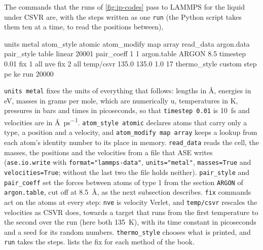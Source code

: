 The commands that the runs of \cref{fig:ip-codes} pass to LAMMPS for the
liquid under CSVR are, with the steps written as one \texttt{run} (the
Python script takes them ten at a time, to read the positions between),
\begin{code}[language={},morecomment={[l]\#}]
units metal
atom_style atomic
atom_modify map array
read_data argon.data
pair_style table linear 20001
pair_coeff 1 1 argon.table ARGON 8.5
timestep 0.01
fix 1 all nve
fix 2 all temp/csvr 135.0 135.0 1.0 17
thermo_style custom step pe ke
run 20000
\end{code}
\noindent \texttt{units metal} fixes the units of everything that
follows: lengths in \si{\angstrom}, energies in \si{\electronvolt}, masses
in grams per mole, which are numerically \si{\amu}, temperatures in
\si{\kelvin}, pressures in bars and times in picoseconds, so that
\texttt{timestep 0.01} is \SI{10}{\femto\second} and velocities are in
\si{\angstrom\per\pico\second}. \texttt{atom\_style atomic} declares
atoms that carry only a type, a position and a velocity, and
\texttt{atom\_modify map array} keeps a lookup from each atom's identity
number to its place in memory. \texttt{read\_data} reads the cell, the
masses, the positions and the velocities from a file that ASE writes
(\texttt{ase.io.write} with \texttt{format="lammps-data"},
\texttt{units="metal"}, \texttt{masses=True} and
\texttt{velocities=True}; without the last two the file holds neither).
\texttt{pair\_style} and \texttt{pair\_coeff} set the forces between atoms
of type 1 from the section \texttt{ARGON} of \texttt{argon.table}, cut
off at \SI{8.5}{\angstrom}, as the next subsection describes.
\texttt{fix} commands act on the atoms at every step: \texttt{nve} is
velocity Verlet, and \texttt{temp/csvr} rescales the velocities as CSVR
does, towards a target that runs from the first temperature to the
second over the run (here both \SI{135}{\kelvin}), with its time constant
in picoseconds and a seed for its random numbers. \texttt{thermo\_style} chooses what is printed,
and \texttt{run} takes the steps.  lists the fix for
each method of the book.

